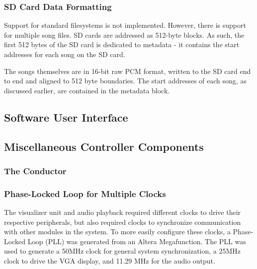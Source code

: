 \documentclass{article}
\begin{document}
\subsubsection{SD Card Data Formatting}

Support for standard filesystems is not implemented. However, there is support
for multiple song files. SD cards are addressed as 512-byte blocks. As such,
the first 512 bytes of the SD card is dedicated to metadata - it contains the
start addresses for each song on the SD card.

The songs themselves are in 16-bit raw PCM format, written to the SD card end
to end and aligned to 512 byte boundaries. The start addresses of each
song, as discussed earlier, are contained in the metadata block.

\subsection{Software User Interface}

\subsection{Miscellaneous Controller Components}
\subsubsection{The Conductor}
\subsubsection{Phase-Locked Loop for Multiple Clocks}

The visualizer unit and audio playback required different clocks to drive their 
respective peripherals, but also required clocks to synchronize communication 
with other modules in the system. To more easily configure these clocks, 
a Phase-Locked Loop (PLL) was generated from an Altera Megafunction. The PLL 
was used to generate a 50MHz clock for general system synchronization, a 25MHz 
clock to drive the VGA display, and 11.29 MHz for the audio output. 
\end{document}
